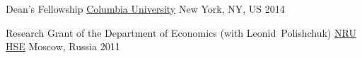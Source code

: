 



\begin{cvhonors}

  \cvhonor
    {Dean's Fellowship} %
    {\href{http://www.columbia.edu/}{Columbia University}} %
    {New York, NY, US} %
    {2014} %

  \cvhonor
    {Research Grant of the Department of Economics (with Leonid~Polishchuk)} %
    {\href{http://www.hse.ru/en/}{NRU HSE}} %
    {Moscow, Russia} %
    {2011} %

\end{cvhonors}






